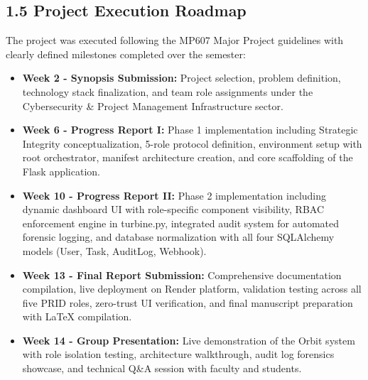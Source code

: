 ﻿\documentclass[12pt]{article}
\begin{document}
\subsection*{1.5 Project Execution Roadmap}
The project was executed following the MP607 Major Project guidelines with clearly defined milestones completed over the semester:
\begin{itemize}
\item \textbf{Week 2 - Synopsis Submission:} Project selection, problem definition, technology stack finalization, and team role assignments under the Cybersecurity \& Project Management Infrastructure sector.
\item \textbf{Week 6 - Progress Report I:} Phase 1 implementation including Strategic Integrity conceptualization, 5-role protocol definition, environment setup with root orchestrator, manifest architecture creation, and core scaffolding of the Flask application.
\item \textbf{Week 10 - Progress Report II:} Phase 2 implementation including dynamic dashboard UI with role-specific component visibility, RBAC enforcement engine in turbine.py, integrated audit system for automated forensic logging, and database normalization with all four SQLAlchemy models (User, Task, AuditLog, Webhook).
\item \textbf{Week 13 - Final Report Submission:} Comprehensive documentation compilation, live deployment on Render platform, validation testing across all five PRID roles, zero-trust UI verification, and final manuscript preparation with LaTeX compilation.
\item \textbf{Week 14 - Group Presentation:} Live demonstration of the Orbit system with role isolation testing, architecture walkthrough, audit log forensics showcase, and technical Q\&A session with faculty and students.
\end{itemize}
\end{document}
